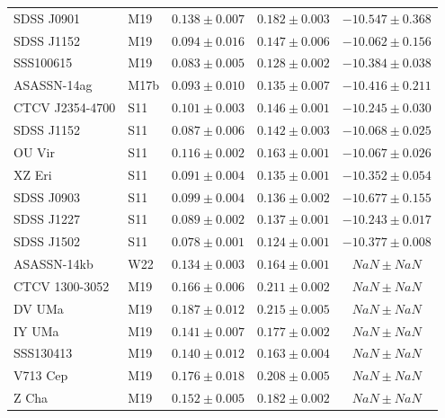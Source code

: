 \begin{table}
\begin{tabular}{llccc}
        SDSS J0901          &  M19      & $0.138 \pm 0.007$ & $0.182 \pm 0.003$ & $-10.547 \pm 0.368$ \\
        SDSS J1152          &  M19      & $0.094 \pm 0.016$ & $0.147 \pm 0.006$ & $-10.062 \pm 0.156$ \\
        SSS100615           &  M19      & $0.083 \pm 0.005$ & $0.128 \pm 0.002$ & $-10.384 \pm 0.038$ \\
        ASASSN-14ag         &  M17b     & $0.093 \pm 0.010$ & $0.135 \pm 0.007$ & $-10.416 \pm 0.211$ \\
        CTCV J2354-4700     &  S11      & $0.101 \pm 0.003$ & $0.146 \pm 0.001$ & $-10.245 \pm 0.030$ \\
        SDSS J1152          &  S11      & $0.087 \pm 0.006$ & $0.142 \pm 0.003$ & $-10.068 \pm 0.025$ \\
        OU Vir              &  S11      & $0.116 \pm 0.002$ & $0.163 \pm 0.001$ & $-10.067 \pm 0.026$ \\
        XZ Eri              &  S11      & $0.091 \pm 0.004$ & $0.135 \pm 0.001$ & $-10.352 \pm 0.054$ \\
        SDSS J0903          &  S11      & $0.099 \pm 0.004$ & $0.136 \pm 0.002$ & $-10.677 \pm 0.155$ \\
        SDSS J1227          &  S11      & $0.089 \pm 0.002$ & $0.137 \pm 0.001$ & $-10.243 \pm 0.017$ \\
        SDSS J1502          &  S11      & $0.078 \pm 0.001$ & $0.124 \pm 0.001$ & $-10.377 \pm 0.008$ \\
        ASASSN-14kb         &  W22      & $0.134 \pm 0.003$ & $0.164 \pm 0.001$ & $    NaN \pm   NaN$ \\
        CTCV 1300-3052      &  M19      & $0.166 \pm 0.006$ & $0.211 \pm 0.002$ & $    NaN \pm   NaN$ \\
        DV UMa              &  M19      & $0.187 \pm 0.012$ & $0.215 \pm 0.005$ & $    NaN \pm   NaN$ \\
        IY UMa              &  M19      & $0.141 \pm 0.007$ & $0.177 \pm 0.002$ & $    NaN \pm   NaN$ \\
        SSS130413           &  M19      & $0.140 \pm 0.012$ & $0.163 \pm 0.004$ & $    NaN \pm   NaN$ \\
        V713 Cep            &  M19      & $0.176 \pm 0.018$ & $0.208 \pm 0.005$ & $    NaN \pm   NaN$ \\
        Z Cha               &  M19      & $0.152 \pm 0.005$ & $0.182 \pm 0.002$ & $    NaN \pm   NaN$ \\

\end{tabular}
\end{table}
